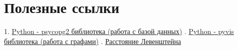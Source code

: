 \documentclass[12pt]{article}
\begin{document}
\section*{Полезные ссылки}
1. \href{https://zetcode.com/python/psycopg2/}{\color{blue}Python - psycopg2 библиотека (работа с базой данных)} . \href{https://pyvis.readthedocs.io/en/latest/}{\color{blue}Python - pyvis библиотека (работа с графами)} . \href{https://neerc.ifmo.ru/wiki/index.php?title=%D0%97%D0%B0%D0%B4%D0%B0%D1%87%D0%B0_%D0%BE_%D1%80%D0%B0%D1%81%D1%81%D1%82%D0%BE%D1%8F%D0%BD%D0%B8%D0%B8_%D0%94%D0%B0%D0%BC%D0%B5%D1%80%D0%B0%D1%83-%D0%9B%D0%B5%D0%B2%D0%B5%D0%BD%D1%88%D1%82%D0%B5%D0%B9%D0%BD%D0%B0}{\color{blue}Расстояние Левенштейна} \newline
\end{document}
